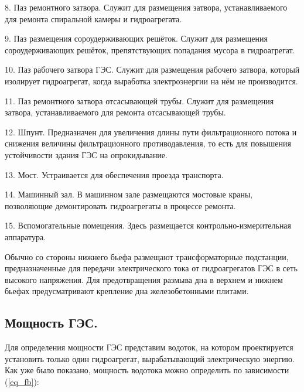 8. Паз ремонтного затвора. Служит для размещения затвора, устанавливаемого для ремонта спиральной камеры и гидроагрегата.

9. Паз размещения сороудерживающих решёток. Служит для размещения сороудерживающих решёток, препятствующих попадания мусора в гидроагрегат.

10. Паз рабочего затвора ГЭС. Служит для размещения рабочего затвора, который изолирует гидроагрегат, когда выработка электроэнергии на нём не производится.

11. Паз ремонтного затвора отсасывающей трубы. Служит для размещения затвора, устанавливаемого для ремонта отсасывающей трубы. 

12. Шпунт. Предназначен для увеличения длины пути фильтрационного потока и снижения величины фильтрационного противодавления, то есть для повышения устойчивости здания ГЭС на опрокидывание.

13. Мост. Устраивается для обеспечения проезда транспорта.

14. Машинный зал. В машинном зале размещаются мостовые краны, позволяющие демонтировать гидроагрегаты в процессе ремонта.

15. Вспомогательные помещения. Здесь размещается контрольно-измерительная аппаратура.

Обычно со стороны нижнего бьефа размещают трансформаторные подстанции, предназначенные для передачи электрического тока от гидроагрегатов ГЭС в сеть высокого напряжения. Для предотвращения размыва дна в верхнем и нижнем бьефах предусматривают крепление дна железобетонными плитами.







\subsection{Мощность ГЭС.}
\label{moshnost}
Для определения мощности ГЭС представим водоток, на котором проектируется установить только один гидроагрегат, вырабатывающий электрическую энергию. Как уже было показано, мощность водотока можно определить по зависимости (\ref{eq_fb}):

